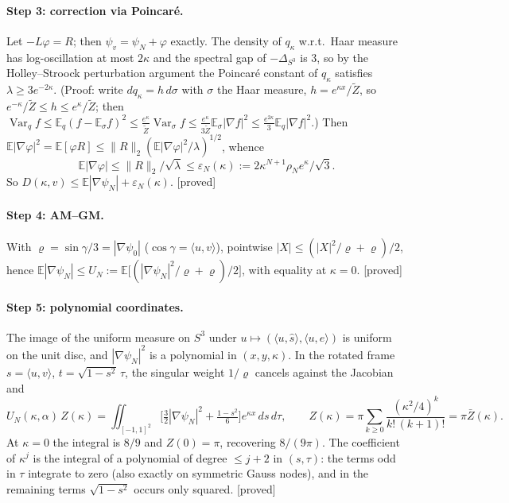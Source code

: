 \documentclass[11pt,a4paper]{article}
\theoremstyle{remark}
\theoremstyle{definition}
\newcommand{\E}{\mathbb{E}}
\newcommand{\st}[1]{\textsf{[#1]}}
\newcommand{\Zb}{\bar Z}
\begin{document}
\paragraph{Step 3: correction via Poincar\'e.} Let $-L\varphi=R$; then $\psi_v=\psi_N+\varphi$ exactly. The
density of $q_\kappa$ w.r.t.\ Haar measure has log-oscillation at most $2\kappa$ and the spectral gap of
$-\Delta_{S^3}$ is $3$, so by the Holley--Stroock perturbation argument \cite{HS87} the Poincar\'e constant
of $q_\kappa$ satisfies $\lambda\ge3e^{-2\kappa}$. (Proof: write $dq_\kappa=h\,d\sigma$ with $\sigma$ the
Haar measure, $h=e^{\kappa x}/\tilde Z$, so $e^{-\kappa}/\tilde Z\le h\le e^{\kappa}/\tilde Z$; then
$\operatorname{Var}_{q}f\le\E_q(f-\E_\sigma f)^2\le\frac{e^{\kappa}}{\tilde Z}\operatorname{Var}_\sigma f
\le\frac{e^{\kappa}}{3\tilde Z}\E_\sigma|\nabla f|^2\le\frac{e^{2\kappa}}{3}\E_q|\nabla f|^2$.) Then
$\E|\nabla\varphi|^2=\E[\varphi R]\le\|R\|_2(\E|\nabla\varphi|^2/\lambda)^{1/2}$, whence
\[
\E|\nabla\varphi|\le\|R\|_2/\sqrt\lambda\le\varepsilon_N(\kappa):=2\kappa^{N+1}\rho_N e^{\kappa}/\sqrt3 .
\]
So $D(\kappa,v)\le\E|\nabla\psi_N|+\varepsilon_N(\kappa)$. \st{proved}

\paragraph{Step 4: AM--GM.} With $\varrho=\sin\gamma/3=|\nabla\psi_0|$ ($\cos\gamma=\langle u,v\rangle$),
pointwise $|X|\le(|X|^2/\varrho+\varrho)/2$, hence
$\E|\nabla\psi_N|\le U_N:=\E\big[(|\nabla\psi_N|^2/\varrho+\varrho)/2\big]$, with equality at $\kappa=0$. \st{proved}

\paragraph{Step 5: polynomial coordinates.} The image of the uniform measure on $S^3$ under
$u\mapsto(\langle u,\hat s\rangle,\langle u,e\rangle)$ is uniform on the unit disc, and $|\nabla\psi_N|^2$ is a
polynomial in $(x,y,\kappa)$. In the rotated frame $s=\langle u,v\rangle$, $t=\sqrt{1-s^2}\,\tau$, the singular
weight $1/\varrho$ cancels against the Jacobian and
\[
U_N(\kappa,\alpha)\,Z(\kappa)=\iint_{[-1,1]^2}\Big[\tfrac32|\nabla\psi_N|^2+\tfrac{1-s^2}{6}\Big]e^{\kappa x}\,ds\,d\tau,
\qquad Z(\kappa)=\pi\sum_{k\ge0}\frac{(\kappa^2/4)^k}{k!\,(k+1)!}=\pi\Zb(\kappa).
\]
At $\kappa=0$ the integral is $8/9$ and $Z(0)=\pi$, recovering $8/(9\pi)$. The coefficient of $\kappa^j$ is the
integral of a polynomial of degree $\le j+2$ in $(s,\tau)$: the terms odd in $\tau$ integrate to zero
(also exactly on symmetric Gauss nodes), and in the remaining terms $\sqrt{1-s^2}$ occurs only squared.
\st{proved}
\end{document}
